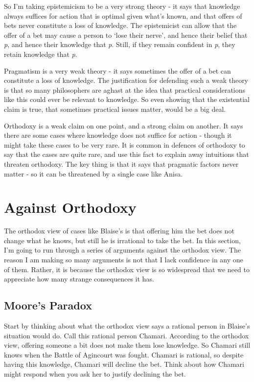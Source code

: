 \documentclass[
  10pt,
  letterpaper,
  twoside]{scrbook}
\begin{document}
So I'm taking epistemicism to be a very strong theory - it says that
knowledge always suffices for action that is optimal given what's known,
and that offers of bets never constitute a loss of knowledge. The
epistemicist can allow that the offer of a bet may cause a person to
`lose their nerve', and hence their belief that \emph{p}, and hence
their knowledge that \emph{p}. Still, if they remain confident in
\emph{p}, they retain knowledge that \emph{p}.

Pragmatism is a very weak theory - it says sometimes the offer of a bet
can constitute a loss of knowledge. The justification for defending such
a weak theory is that so many philosophers are aghast at the idea that
practical considerations like this could ever be relevant to knowledge.
So even showing that the existential claim is true, that sometimes
practical issues matter, would be a big deal.

Orthodoxy is a weak claim on one point, and a strong claim on another.
It says there are some cases where knowledge does not suffice for action
- though it might take these cases to be very rare. It is common in
defences of orthodoxy to say that the cases are quite rare, and use this
fact to explain away intuitions that threaten orthodoxy. The key thing
is that it says that pragmatic factors never matter - so it can be
threatened by a single case like Anisa.

\section{Against Orthodoxy}\label{sec-orthodox}

The orthodox view of cases like Blaise's is that offering him the bet
does not change what he knows, but still he is irrational to take the
bet. In this section, I'm going to run through a series of arguments
against the orthodox view. The reason I am making so many arguments is
not that I lack confidence in any one of them. Rather, it is because the
orthodox view is so widespread that we need to appreciate how many
strange consequences it has.

\subsection{Moore's Paradox}\label{sec-orthodoxmoore}

Start by thinking about what the orthodox view says a rational person in
Blaise's situation would do. Call this rational person Chamari.
According to the orthodox view, offering someone a bit does not make
them lose knowledge. So Chamari still knows when the Battle of Agincourt
was fought. Chamari is rational, so despite having this knowledge,
Chamari will decline the bet. Think about how Chamari might respond when
you ask her to justify declining the bet.
\end{document}
